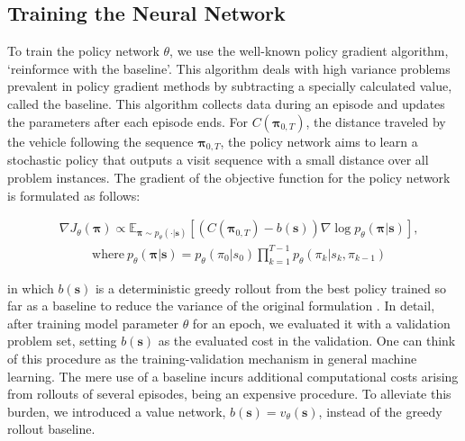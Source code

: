 \documentclass{article}
\begin{document}
\subsection{Training the Neural Network}

To train the policy network $\theta$, we use the well-known policy gradient algorithm, `reinformce with the baseline'\cite{williamsREINFORCE}. This algorithm deals with high variance problems prevalent in policy gradient methods by subtracting a specially calculated value, called the baseline. This algorithm collects data during an episode and updates the parameters after each episode ends.
For $C(\boldsymbol{\pi}_{0,T})$, the distance traveled by the vehicle following the sequence $\boldsymbol{\pi}_{0,T}$,
the policy network aims to learn a stochastic policy that outputs a visit sequence with a small distance over all problem instances. The gradient of the objective function for the policy network is formulated as follows:

\begin{align}\label{eqn:gradient-of-policy-objective1}
        & \nabla J_\theta(\boldsymbol{\pi}) \varpropto \mathbb{E}_{\boldsymbol{\pi}
 \sim p_\theta(\cdot |\boldsymbol{s})}[(C(\boldsymbol{\pi}_{0,T}) - b(\boldsymbol{s}))\nabla \log p_\theta(\boldsymbol{\pi}|\boldsymbol{s})],
 \end{align}
 \begin{align*}
        & \text{where}~ p_\theta(\boldsymbol{\pi} | \boldsymbol{s}) = p_\theta(\pi_0 | s_0) \prod_{k=1}^{T-1}p_\theta(\pi_k | s_k, \pi_{k-1})
\end{align*}

in which $b(\boldsymbol{s})$ is a deterministic greedy rollout from the best policy trained so far as a baseline to reduce the variance of the original formulation \cite{kool2018attention}. In detail, after training model parameter $\theta$ for an epoch, we evaluated it with a validation problem set, setting $b(\boldsymbol{s})$ as the evaluated cost in the validation. One can think of this procedure as the training-validation mechanism in general machine learning.
The mere use of a baseline incurs additional computational costs arising from rollouts of several episodes, being an expensive procedure.
To alleviate this burden, we introduced a value network, $b(\boldsymbol{s})=v_\theta(\boldsymbol{s})$, instead of the greedy rollout baseline.
\end{document}
